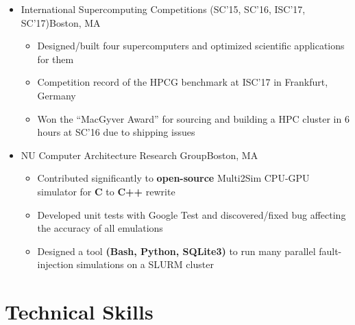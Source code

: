 \documentclass[11pt,letterpaper,sans]{moderncv}
\begin{document}
\begin{itemize}

\item[] {
{International Supercomputing Competitions (SC'15, SC'16, ISC'17, SC'17)}{Boston, MA}{}{\vspace{1pt}}
\vspace{-8pt}	\begin{itemize}
		\item Designed/built four supercomputers and optimized scientific applications for them
		\item Competition record of the HPCG benchmark at ISC'17 in Frankfurt, Germany
		\item Won the ``MacGyver Award'' for sourcing and building a HPC cluster in 6 hours at SC'16 due to shipping issues
		\end{itemize}
}
\vspace{6pt}


\item[] {
{NU Computer Architecture Research Group}{Boston, MA}{}{\vspace{1pt}}
\vspace{-8pt}	\begin{itemize}
		\item Contributed significantly to \textbf{open-source} Multi2Sim CPU-GPU simulator for \textbf{C} to \textbf{C++} rewrite
		\item Developed unit tests with Google Test and discovered/fixed bug affecting the accuracy of all emulations 
		\item Designed a tool \textbf{(Bash, Python, SQLite3)} to run many parallel fault-injection simulations on a SLURM cluster
		\end{itemize}
		
}

\end{itemize}
\vspace{-6pt}


\section{Technical Skills}
\end{document}
